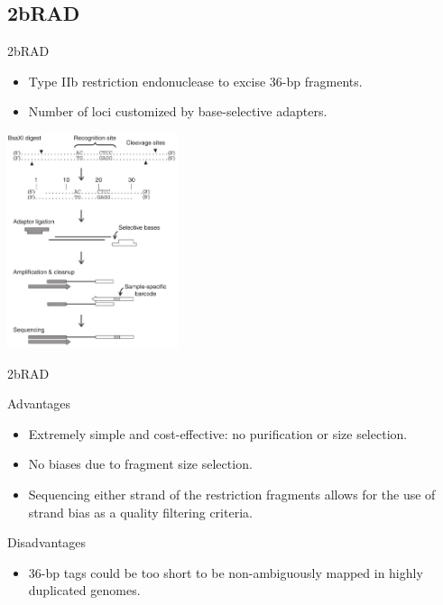 \documentclass[presentation]{beamer}
\begin{document}
\subsection{2bRAD}
\label{sec-2-4}
\begin{frame}[label=sec-2-4-1]{2bRAD \citep{Wang2012}}
\begin{itemize}
\item Type IIb restriction endonuclease to excise 36-bp fragments.
\item Number of loci customized by base-selective adapters.
\end{itemize}

\begin{center}
\includegraphics[width=5cm]{Wang2012Fig1.png}


\tiny{\citep{Wang2012}}
\end{center}
\end{frame}

\begin{frame}[label=sec-2-4-2]{2bRAD \citep{Wang2012}}
\begin{block}{Advantages}
\begin{itemize}
\item Extremely simple and cost-effective: no purification or size selection.
\item No biases due to fragment size selection.
\item Sequencing either strand of the restriction fragments allows for the
use of strand bias as a quality filtering criteria.
\end{itemize}
\end{block}
\begin{block}{Disadvantages}
\begin{itemize}
\item 36-bp tags could be too short to be non-ambiguously mapped in highly
duplicated genomes.
\end{itemize}
\end{block}
\end{frame}
\end{document}
